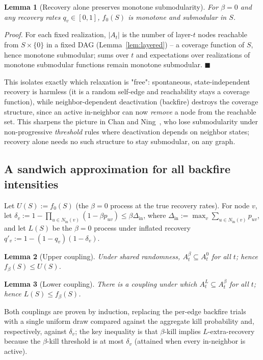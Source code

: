 \documentclass[journal]{IEEEtran}
\newtheorem{lemma}{Lemma}
\newcommand{\eqdef}{:=}
\begin{document}
\begin{lemma}[Recovery alone preserves monotone submodularity]
\label{lem:recovery-submodular}
For $\beta=0$ and any recovery rates $q_v\in[0,1]$, $f_0(S)$ is monotone and
submodular in $S$.
\end{lemma}
\emph{Proof.} For each fixed realization, $|A_t|$ is the number of
layer-$t$ nodes reachable from $S\times\{0\}$ in a fixed DAG (Lemma~\ref{lem:layered}) --
a coverage function of $S$, hence monotone submodular; sums over $t$ and
expectations over realizations of monotone submodular functions remain
monotone submodular. $\blacksquare$

This isolates exactly which relaxation is "free": spontaneous,
state-independent recovery is harmless (it is a random self-edge and
reachability stays a coverage function), while neighbor-dependent
deactivation (backfire) destroys the coverage structure, since an active
in-neighbor can now \emph{remove} a node from the reachable set. This
sharpens the picture in Chan and Ning~\cite{chan2015influence}, who lose
submodularity under non-progressive \emph{threshold} rules where
deactivation depends on neighbor states; recovery alone needs no such
structure to stay submodular, on any graph.

\subsection{A sandwich approximation for all backfire intensities}

Let $U(S)\eqdef f_0(S)$ (the $\beta=0$ process at the true recovery rates).
For node $v$, let
$\delta_v \eqdef 1-\prod_{u\in N_{\mathrm{in}}(v)}(1-\beta p_{uv}) \le \beta\Delta_{\mathrm{in}}$,
where $\Delta_{\mathrm{in}}\eqdef\max_v\sum_{u\in N_{\mathrm{in}}(v)}p_{uv}$,
and let $L(S)$ be the $\beta=0$ process under inflated recovery
$q'_v\eqdef1-(1-q_v)(1-\delta_v)$.

\begin{lemma}[Upper coupling]
\label{lem:upper}
Under shared randomness, $A^\beta_t\subseteq A^0_t$ for all $t$; hence
$f_\beta(S)\le U(S)$.
\end{lemma}

\begin{lemma}[Lower coupling]
\label{lem:lower}
There is a coupling under which $A^L_t\subseteq A^\beta_t$ for all $t$;
hence $L(S)\le f_\beta(S)$.
\end{lemma}

Both couplings are proven by induction, replacing the per-edge backfire
trials with a single uniform draw compared against the aggregate kill
probability and, respectively, against $\delta_v$; the key inequality is
that $\beta$-kill implies $L$-extra-recovery because the $\beta$-kill
threshold is at most $\delta_v$ (attained when every in-neighbor is
active).
\end{document}
